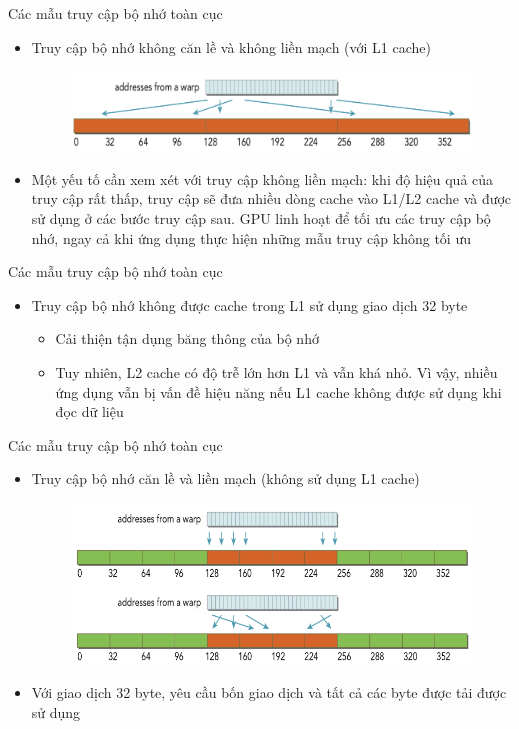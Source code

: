 \documentclass[10pt]{beamer}
\theoremstyle{remark}
\numberwithin{algocf}{section}
\numberwithin{equation}{section}
\numberwithin{dl}{section}
\numberwithin{figure}{section}
\begin{document}
\begin{frame}{Các mẫu truy cập bộ nhớ toàn cục}
    \begin{itemize}
        \item Truy cập bộ nhớ không căn lề và không liền mạch (với L1 cache)
        \begin{figure}[H]
            \centering
            \includegraphics[width=0.7\linewidth]{figures/CUDA/Misaligned_Uncoalesced_Global_Memory_Transaction_2.png}
        \end{figure}
        \item Một yếu tố cần xem xét với truy cập không liền mạch: khi độ hiệu quả của truy cập rất thấp, truy cập sẽ đưa nhiều dòng cache vào L1/L2 cache và được sử dụng ở các bước truy cập sau.
        GPU linh hoạt để tối ưu các truy cập bộ nhớ, ngay cả khi ứng dụng thực hiện những mẫu truy cập không tối ưu
    \end{itemize}
\end{frame}

\begin{frame}{Các mẫu truy cập bộ nhớ toàn cục}
    \begin{itemize}
        \item Truy cập bộ nhớ không được cache trong L1 sử dụng giao dịch 32 byte
        \begin{itemize}
            \item Cải thiện tận dụng băng thông của bộ nhớ
            \item Tuy nhiên, L2 cache có độ trễ lớn hơn L1 và vẫn khá nhỏ.
            Vì vậy, nhiều ứng dụng vẫn bị vấn đề hiệu năng nếu L1 cache không được sử dụng khi đọc dữ liệu
        \end{itemize}
    \end{itemize}
\end{frame}

\begin{frame}{Các mẫu truy cập bộ nhớ toàn cục}
    \begin{itemize}
        \item Truy cập bộ nhớ căn lề và liền mạch (không sử dụng L1 cache)
        \begin{figure}[H]
            \centering
            \includegraphics[width=0.7\linewidth]{figures/CUDA/Aligned_Coalesced_Global_Memory_Transaction_2.png}
        \end{figure}
        \item Với giao dịch 32 byte, yêu cầu bốn giao dịch và tất cả các byte được tải được sử dụng
    \end{itemize}
\end{frame}
\end{document}

